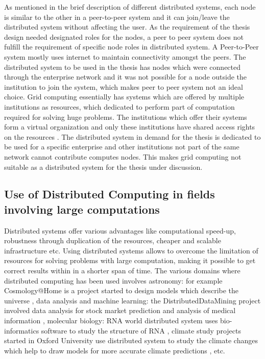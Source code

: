 As mentioned in the brief description of different distributed systems, each node is similar to the other in a peer-to-peer system and it can join/leave the distributed system without affecting the user. As the requirement of the thesis design needed designated roles for the nodes, a peer to peer system does not fulfill the requirement of specific node roles in distributed system. A Peer-to-Peer system mostly uses internet to maintain connectivity amongst the peers. The distributed system to be used in the thesis has nodes which were connected through the enterprise network and it was not possible for a node outside the institution to join the system, which makes peer to peer system not an ideal choice. Grid computing essentially has systems which are offered by multiple institutions as resources, which dedicated to perform part of computation required for solving huge problems. The institutions which offer their systems form a virtual organization and only these institutions have shared access rights on the resources \cite{DSBook}. The distributed system in demand for the thesis is dedicated to be used for a specific enterprise and other institutions not part of the same network cannot contribute computes nodes. This makes grid computing not suitable as a distributed system for the thesis under discussion. 


\subsection{Use of Distributed Computing in fields involving large computations}

Distributed systems offer various advantages like computational speed-up, robustness through duplication of the resources, cheaper and scalable infrastructure etc. 
Using distributed systems allows to overcome the limitation of resources for solving problems with large computation, making it possible to get correct results within in a shorter span of time. The various domains where distributed computing has been used involves astronomy: for example Cosmology@Home is a project started to design models which describe the universe \cite{coshome}, data analysis and machine learning: the DistributedDataMining project involved data analysis for stock market prediction and analysis of medical information \cite{DisDataMin}, molecular biology: RNA world distributed system uses bio-informatics software to study the structure of RNA \cite{rnaworld}, climate study projects started in Oxford University use distributed system to study the climate changes which help to draw models for more accurate climate predictions \cite{ClimaProj}, etc. \newline

